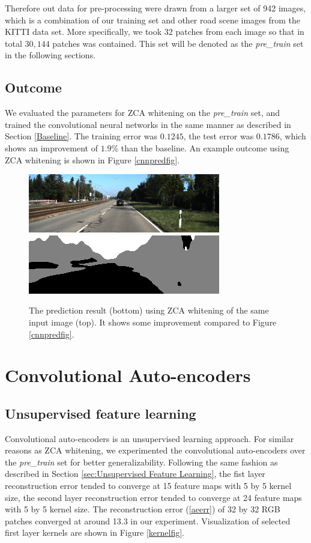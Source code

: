 Therefore out data for pre-processing were drawn from a larger set of 942 images, which is a combination of our training set and other road scene images from the KITTI data set. More specifically, we took 32 patches from each image so that in total $30,144$ patches was contained. This set will be denoted as the \textit{pre\_train} set in the following sections.
\subsection{Outcome}
We evaluated the parameters for ZCA whitening on the \textit{pre\_train} set, and trained the convolutional neural networks in the same manner as described in Section \ref{Baseline}. The training error was $0.1245$, the test error was $0.1786$, which shows an improvement of $1.9\%$ than the baseline. An example outcome using ZCA whitening is shown in Figure \ref{cnnpredfig}.

\begin{figure}[h!]
\centering
\includegraphics[width=0.7\linewidth]{pics/img.png}
\includegraphics[width=0.7\linewidth]{pics/raw.png}
\caption{The prediction result (bottom) using ZCA whitening of the same input image (top). It shows some improvement compared to Figure \ref{cnnpredfig}.}
\label{zcapredfig}
\end{figure}

\section{Convolutional Auto-encoders}
\label{sec: cae}
\subsection{Unsupervised feature learning}
Convolutional auto-encoders is an unsupervised learning approach. For similar reasons as ZCA whitening, we experimented the convolutional auto-encoders over the \textit{pre\_train} set for better generalizability. Following the same fashion as described in Section \ref{sec:Unsupervised Feature Learning}, the fist layer reconstruction error tended to converge at 15 feature maps with 5 by 5 kernel size, the second layer reconstruction error tended to converge at 24 feature maps with 5 by 5 kernel size. The reconstruction error (\ref{aeerr}) of 32 by 32 RGB patches converged at around 13.3 in our experiment. Visualization of selected first layer kernels are shown in Figure \ref{kernelfig}.


